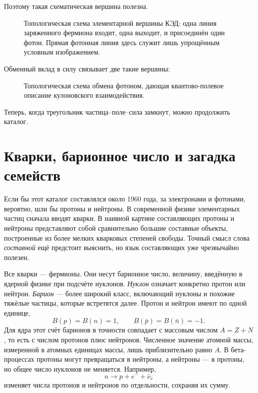 Поэтому такая схематическая вершина полезна.

\begin{figure}[h]
\centering
{}
\caption{Топологическая схема элементарной вершины КЭД: одна линия заряженного фермиона входит, одна выходит, и присоединён один фотон. Прямая фотонная линия здесь служит лишь упрощённым условным изображением.}
\end{figure}

Обменный вклад в силу связывает две такие вершины:

\begin{figure}[h]
\centering
{}
\caption{Топологическая схема обмена фотоном, дающая квантово-полевое описание кулоновского взаимодействия.}
\end{figure}

Теперь, когда треугольник частица--поле--сила замкнут, можно продолжить каталог.

\section{Кварки, барионное число и загадка семейств}

Если бы этот каталог составлялся около 1960 года, за электронами и фотонами, вероятно, шли бы протоны и нейтроны. В современной физике элементарных частиц сначала вводят кварки. В наивной картине составляющих протоны и нейтроны представляют собой сравнительно большие составные объекты, построенные из более мелких кварковых степеней свободы. Точный смысл слова \emph{составной} ещё предстоит выяснить, но язык составляющих уже чрезвычайно полезен.

Все кварки — фермионы. Они несут барионное число, величину, введённую в ядерной физике при подсчёте нуклонов. \emph{Нуклон} означает конкретно протон или нейтрон. \emph{Барион} — более широкий класс, включающий нуклоны и похожие тяжёлые частицы, которые встретятся далее. Протон и нейтрон имеют по одной единице,
\begin{equation}
B(p)=B(n)=1,
\qquad
B(\bar p)=B(\bar n)=-1.
\end{equation}
Для ядра этот счёт барионов в точности совпадает с массовым числом \(A=Z+N\), то есть с числом протонов плюс нейтронов. Численное значение атомной массы, измеренной в атомных единицах массы, лишь приблизительно равно \(A\). В бета-процессах протоны могут превращаться в нейтроны, а нейтроны — в протоны, но общее число нуклонов не меняется. Например,
\begin{equation}
n\longrightarrow p+e^-+\bar\nu_e
\end{equation}
изменяет числа протонов и нейтронов по отдельности, сохраняя их сумму.

